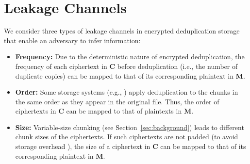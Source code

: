 
\section{Leakage Channels}
\label{sec:ThreatModel-Leakage}

We consider three types of leakage channels in encrypted deduplication storage
that enable an adversary to infer information:
\begin{itemize}[leftmargin=*]
\item
{\bf Frequency:}  Due to the deterministic nature of encrypted deduplication,
the frequency of each ciphertext in $\mathbf{C}$ before deduplication (i.e., 
the number of duplicate copies) can be mapped to that of its corresponding
plaintext in $\mathbf{M}$. 
\item
{\bf Order:}  Some storage systems (e.g., \cite{xia11,lillibridge09,zhu08})
apply deduplication to the chunks in the same order as they appear in the
original file.  Thus, the order of ciphertexts in $\mathbf{C}$ can be mapped
to that of plaintexts in $\mathbf{M}$. 
\item
{\bf Size:}  Variable-size chunking (see Section~\ref{sec:background}) leads
to different chunk sizes of the ciphertexts.  If such ciphertexts are not
padded (to avoid storage overhead \cite{ritzdorf16}), the size of a ciphertext
in $\mathbf{C}$ can be mapped to that of its corresponding plaintext in
$\mathbf{M}$.    
\end{itemize}

